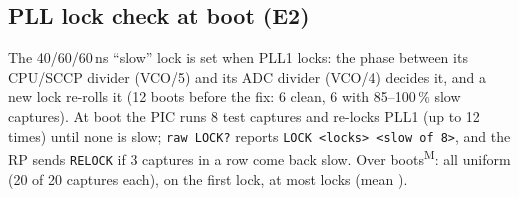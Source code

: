 \documentclass[10pt,a4paper]{article}
\newcommand{\cmd}[1]{\texttt{#1}}
\newcommand{\meas}{\textsuperscript{M}}
\begin{document}
\subsection{PLL lock check at boot (E2)}\label{sec:lock}
The 40/60/60\,ns ``slow'' lock is set when PLL1 locks: the phase between its CPU/SCCP divider (VCO/5) and its ADC divider (VCO/4)
decides it, and a new lock re-rolls it (12 boots before the fix: 6 clean, 6 with 85–100\,\% slow captures). At boot the PIC runs
8 test captures and re-locks PLL1 (up to 12 times) until none is slow; \cmd{raw LOCK?} reports \cmd{LOCK <locks> <slow of 8>}, and
the RP sends \cmd{RELOCK} if 3 captures in a row come back slow. Over \xLockBoots{} boots\meas: all \xLockOk{} uniform (20 of 20
captures each), \xLockFirst{} on the first lock, at most \xLockMax{} locks (mean \xLockMean).

\end{document}
